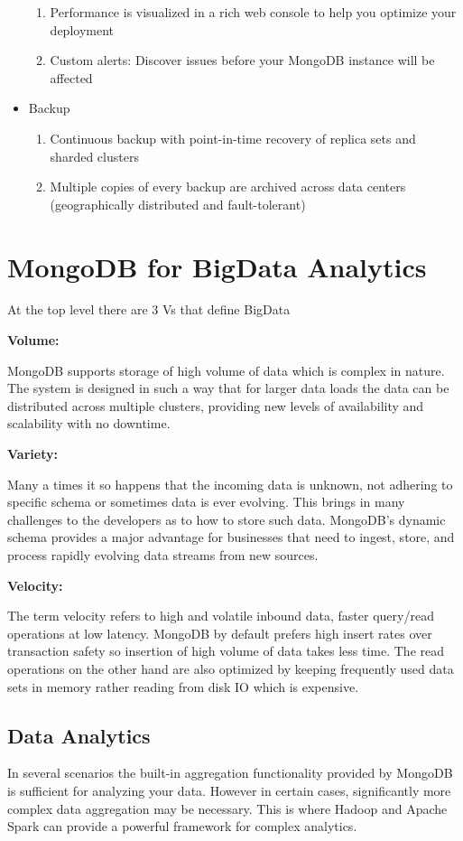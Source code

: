 \documentclass[9pt,twocolumn,twoside]{../../styles/osajnl}
\begin{document}
\begin{itemize}
\begin{enumerate}
    \item Performance is visualized in a rich web console to help you optimize your deployment
    \item Custom alerts: Discover issues before your MongoDB instance will be affected
\end{enumerate}
\item Backup
\begin {enumerate}
    \item Continuous backup with point-in-time recovery of replica sets and sharded clusters
    \item Multiple copies of every backup are archived across data centers (geographically distributed and fault-tolerant)
\end{enumerate}
\end{itemize}

\section{MongoDB for BigData Analytics}

At the top level there are 3 Vs that define BigData \cite{www-mongo1}

{\bfseries Volume:}

MongoDB supports storage of high volume of data which is complex in nature. The system is designed in such a way that for larger data loads the data can be distributed across multiple clusters, providing new levels of availability and scalability with no downtime.

{\bfseries Variety:}

Many a times it so happens that the incoming data is unknown, not adhering to specific schema or sometimes data is ever evolving. This brings in many challenges to the developers as to how to store such data. MongoDB’s dynamic schema provides a major advantage for businesses that need to ingest, store, and process rapidly evolving data streams from new sources.

{\bfseries Velocity:}

The term velocity refers to high and volatile inbound data, faster query/read operations at low latency. MongoDB by default prefers high insert rates over transaction safety so insertion of high volume of data takes less time. The read operations on the other hand are also optimized by keeping frequently used data sets in memory rather reading from disk IO which is expensive.

\subsection{Data Analytics}
\cite{www-mongo7} In several scenarios the built-in aggregation functionality provided by MongoDB is sufficient for analyzing your data. However in certain cases, significantly more complex data aggregation may be necessary. This is where Hadoop and Apache Spark can provide a powerful framework for complex analytics.
\end{document}

